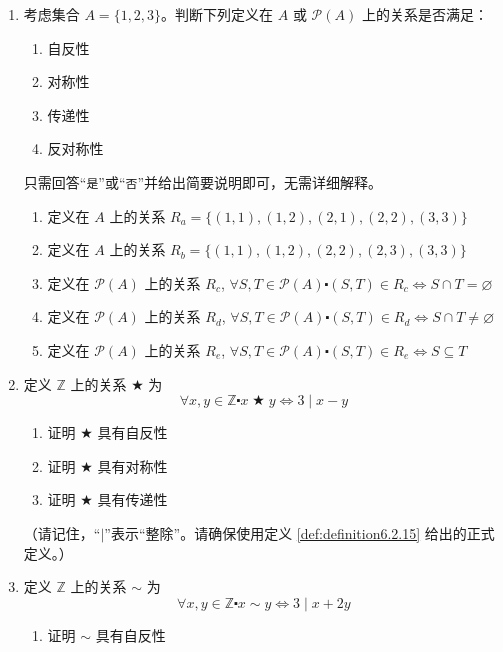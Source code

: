 \begin{enumerate}[label=(\arabic*)]
    \item 考虑集合 $A = \{1, 2, 3\}$。判断下列定义在 $A$ 或 $\mathcal{P}(A)$ 上的关系是否满足：
    \begin{enumerate}[i]
        \item 自反性
        \item 对称性
        \item 传递性
        \item 反对称性
    \end{enumerate}

    只需回答``\verb|是|''或``\verb|否|''并给出简要说明即可，无需详细解释。

    \begin{enumerate}[label=(\alph*)]
        \item 定义在 $A$ 上的关系 $R_a = \{(1, 1),(1, 2),(2, 1),(2, 2),(3, 3)\}$
        \item 定义在 $A$ 上的关系 $R_b = \{(1, 1),(1, 2),(2, 2),(2, 3),(3, 3)\}$
        \item 定义在 $\mathcal{P}(A)$ 上的关系 $R_c$, $\forall S, T \in \mathcal{P}(A) \centerdot (S, T) \in R_c \iff S \cap T = \varnothing$
        \item 定义在 $\mathcal{P}(A)$ 上的关系 $R_d$, $\forall S, T \in \mathcal{P}(A) \centerdot (S, T) \in R_d \iff S \cap T \ne \varnothing$
        \item 定义在 $\mathcal{P}(A)$ 上的关系 $R_e$, $\forall S, T \in \mathcal{P}(A) \centerdot (S, T) \in R_e \iff S \subseteq T$
    \end{enumerate}
    \item 定义 $\mathbb{Z}$ 上的关系 $\bigstar$ 为
    \[\forall x, y \in \mathbb{Z} \centerdot x \;\bigstar\; y \iff 3 \mid x - y\]
    \begin{enumerate}[label=(\alph*)]
        \item 证明 $\bigstar$ 具有自反性
        \item 证明 $\bigstar$ 具有对称性
        \item 证明 $\bigstar$ 具有传递性
    \end{enumerate}
    （请记住，``$\mid$''表示``整除''。请确保使用定义 \ref{def:definition6.2.15} 给出的正式定义。）\label{exc:exercises6.2.2}
    \item 定义 $\mathbb{Z}$ 上的关系 $\sim$ 为
    \[\forall x, y \in \mathbb{Z} \centerdot x \sim y \iff 3 \mid x + 2y\]
    \begin{enumerate}[label=(\alph*)]
        \item 证明 $\sim$ 具有自反性

\end{enumerate}
\end{enumerate}
